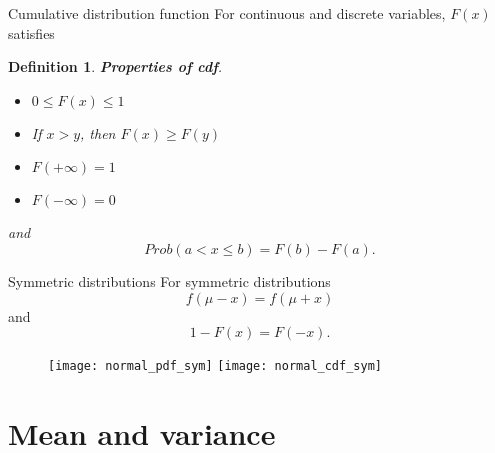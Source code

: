 \documentclass[11pt,table]{beamer}
\newtheorem{assumption}{Definition}
\begin{document}
\begin{frame}{Cumulative distribution function}
For continuous and discrete variables, $F(x)$ satisfies
\small
\begin{assumption} \textbf{Properties of cdf}. 
\begin{itemize}
	\item $0\leq F(x)\leq 1$
	\item If $x>y$, then $F(x)\geq F(y)$
	\item $F(+\infty)=1$
	\item $F(-\infty)=0$
\end{itemize}
and $$Prob(a< x\leq b)=F(b)-F(a).$$
\end{assumption}

\end{frame}


\begin{frame}{Symmetric distributions}
For symmetric distributions $$f(\mu - x) = f(\mu + x)$$
and $$1-F(x)=F(-x).$$
\begin{figure}[H]
\begin{center}
{\texttt{[image: normal\_pdf\_sym]}}\label{normal_pdf_sym}
{\texttt{[image: normal\_cdf\_sym]}}\label{normal_cdf_sym}
\end{center}
\end{figure}
\end{frame}

\section{Mean and variance}
\end{document}

